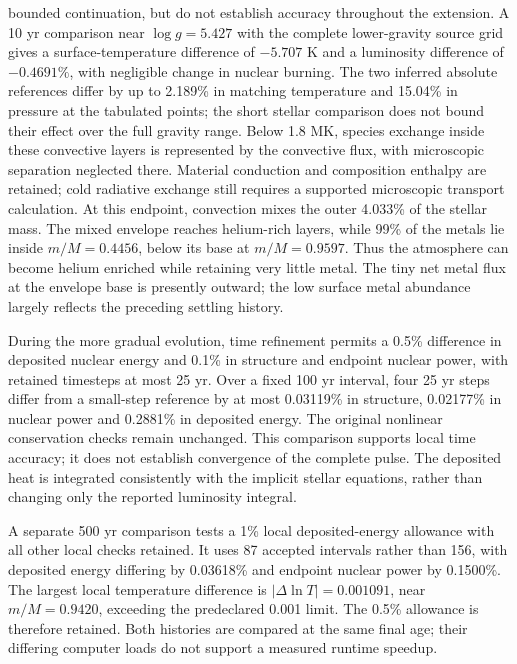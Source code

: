 \documentclass[11pt,letterpaper]{article}
\begin{document}
bounded continuation, but do not establish accuracy throughout the extension.
A 10 yr comparison near $\log g=5.427$ with the complete lower-gravity
source grid gives a surface-temperature difference of $-5.707$ K and a
luminosity difference of $-0.4691\%$, with negligible change in nuclear
burning. The two inferred absolute references differ by up to 2.189\%
in matching temperature and 15.04\% in pressure at the tabulated points;
the short stellar comparison does not bound their effect over the full
gravity range.
Below 1.8 MK, species exchange inside these convective layers is represented
by the convective flux, with microscopic separation neglected there.
Material conduction and composition enthalpy are retained; cold radiative
exchange still requires a supported microscopic transport calculation.
At this endpoint, convection mixes the outer 4.033\% of the stellar mass.
The mixed envelope reaches helium-rich layers, while 99\% of the metals
lie inside $m/M=0.4456$, below its base at $m/M=0.9597$. Thus the atmosphere
can become helium enriched while retaining very little metal. The tiny net
metal flux at the envelope base is presently outward; the low surface metal
abundance largely reflects the preceding settling history.

During the more gradual evolution, time refinement permits a 0.5\% difference
in deposited nuclear energy and 0.1\% in structure and endpoint nuclear power,
with retained timesteps at most 25 yr. Over a fixed 100 yr interval, four
25 yr steps differ from a small-step reference by at most 0.03119\% in
structure, 0.02177\% in nuclear power and 0.2881\% in deposited energy.
The original nonlinear conservation checks remain unchanged. This comparison
supports local time accuracy; it does not establish convergence of the complete
pulse. The deposited heat is integrated consistently with the implicit stellar
equations, rather than changing only the reported luminosity integral.

A separate 500 yr comparison tests a 1\% local deposited-energy allowance
with all other local checks retained. It uses 87 accepted intervals rather
than 156, with deposited energy differing by 0.03618\% and endpoint nuclear
power by 0.1500\%. The largest local temperature difference is
$|\Delta\ln T|=0.001091$, near $m/M=0.9420$, exceeding the predeclared
0.001 limit. The 0.5\% allowance is therefore retained. Both histories are
compared at the same final age; their differing computer loads do not support
a measured runtime speedup.
\end{document}
